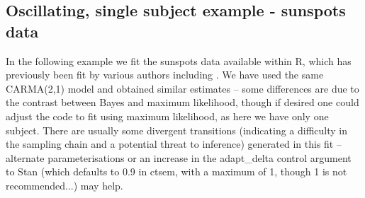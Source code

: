 \documentclass[nojss]{jss}\usepackage[]{graphicx}\usepackage[]{color}
\begin{document}
\subsection{Oscillating, single subject example - sunspots data}
In the following example we fit the sunspots data available within R, which has previously been fit by various authors including \citet{tomasson2013computational}. We have used the same CARMA(2,1) model and obtained similar estimates -- some differences are due to the contrast between Bayes and maximum likelihood, though if desired one could adjust the code to fit using maximum likelihood, as here we have only one subject. There are usually some divergent transitions (indicating a difficulty in the sampling chain and a potential threat to inference) generated in this fit -- alternate parameterisations or an increase in the adapt\_delta control argument to Stan (which defaults to 0.9 in ctsem, with a maximum of 1, though 1 is not recommended...) may help.
\end{document}
